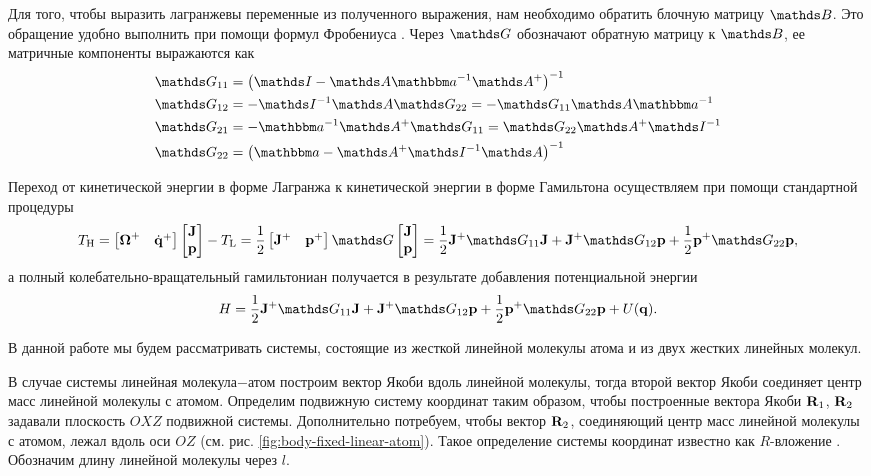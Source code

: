 Для того, чтобы выразить лагранжевы переменные из полученного выражения, нам необходимо обратить блочную матрицу $\bbB$. Это обращение удобно выполнить при помощи формул Фробениуса \cite{petrov2015, gantmaher}. Через $\bbG$ обозначают обратную матрицу к $\bbB$, ее матричные компоненты выражаются как
\begin{gather}
    \begin{aligned}
        \bbG_{11} &= \lb \bbI - \bbA \bba^{-1} \bbA^+ \rb^{-1} \\
        \bbG_{12} &= -\bbI^{-1} \bbA \bbG_{22} = -\bbG_{11} \bbA \bba^{-1} \\
        \bbG_{21} &= -\bba^{-1} \bbA^+ \bbG_{11} = \bbG_{22} \bbA^+ \bbI^{-1} \\
        \bbG_{22} &= \lb \bba - \bbA^+ \bbI^{-1} \bbA \rb^{-1}
    \end{aligned} \label{polyatom-frobenius}
\end{gather}

Переход от кинетической энергии в форме Лагранжа к кинетической энергии в форме Гамильтона осуществляем при помощи стандартной процедуры \cite{goldstein}
\begin{gather}
    \Th = \begin{bmatrix} \bOmega^+ & \dot{\mf{q}}^+ \end{bmatrix} \begin{bmatrix} \mf{J} \\ \mf{p} \end{bmatrix} - \Tl = \frac{1}{2} \begin{bmatrix} \mf{J}^+ & \mf{p}^+ \end{bmatrix} \bbG \begin{bmatrix} \mf{J} \\ \mf{p} \end{bmatrix} = \frac{1}{2} \mf{J}^+ \bbG_{11} \mf{J} + \mf{J}^+ \bbG_{12} \mf{p} + \frac{1}{2} \mf{p}^+ \bbG_{22} \mf{p}, \label{general-rovibrational-kin-energy} 
\end{gather}
а полный колебательно-вращательный гамильтониан получается в результате добавления потенциальной энергии
\begin{gather}
    H = \frac{1}{2} \mf{J}^+ \bbG_{11} \mf{J} + \mf{J}^+ \bbG_{12} \mf{p} + \frac{1}{2} \mf{p}^+ \bbG_{22} \mf{p} + U(\mf{q}). \label{general-rovibrational-hamiltonian} 
\end{gather}

В данной работе мы будем рассматривать системы, состоящие из жесткой линейной молекулы атома и из двух жестких линейных молекул. \par
В случае системы линейная молекула$-$атом построим вектор Якоби вдоль линейной молекулы, тогда второй вектор Якоби соединяет центр масс линейной молекулы с атомом. Определим подвижную систему координат таким образом, чтобы построенные вектора Якоби $\mathbf{R}_1$, $\mathbf{R}_2$ задавали плоскость $OXZ$ подвижной системы. Дополнительно потребуем, чтобы вектор $\mathbf{R}_2$, соединяющий центр масс линейной молекулы с атомом, лежал вдоль оси $OZ$ (см. рис. \ref{fig:body-fixed-linear-atom}). Такое определение системы координат известно как $R$-вложение \cite{tennyson1986}. Обозначим длину линейной молекулы через $l$.
    
